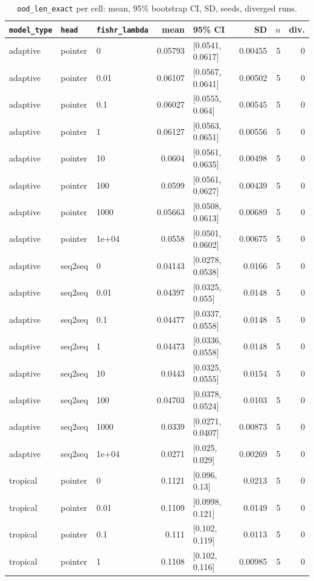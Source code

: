 \documentclass[10pt]{article}
\begin{document}
{\small
\begin{longtable}{lllrlrrr}
\caption{\texttt{ood\_len\_exact} per cell: mean, 95\% bootstrap CI, SD, seeds, diverged runs.}\label{tab:summary-ood_len_exact}\\
\toprule
\texttt{model\_type} & \texttt{head} & \texttt{fishr\_lambda} & mean & 95\% CI & SD & $n$ & div.\\
\midrule
\endhead
adaptive & pointer & 0 & 0.05793 & [0.0541, 0.0617] & 0.00455 & 5 & 0\\
adaptive & pointer & 0.01 & 0.06107 & [0.0567, 0.0641] & 0.00502 & 5 & 0\\
adaptive & pointer & 0.1 & 0.06027 & [0.0555, 0.064] & 0.00545 & 5 & 0\\
adaptive & pointer & 1 & 0.06127 & [0.0563, 0.0651] & 0.00556 & 5 & 0\\
adaptive & pointer & 10 & 0.0604 & [0.0561, 0.0635] & 0.00498 & 5 & 0\\
adaptive & pointer & 100 & 0.0599 & [0.0561, 0.0627] & 0.00439 & 5 & 0\\
adaptive & pointer & 1000 & 0.05663 & [0.0508, 0.0613] & 0.00689 & 5 & 0\\
adaptive & pointer & 1e+04 & 0.0558 & [0.0501, 0.0602] & 0.00675 & 5 & 0\\
adaptive & seq2seq & 0 & 0.04143 & [0.0278, 0.0538] & 0.0166 & 5 & 0\\
adaptive & seq2seq & 0.01 & 0.04397 & [0.0325, 0.055] & 0.0148 & 5 & 0\\
adaptive & seq2seq & 0.1 & 0.04477 & [0.0337, 0.0558] & 0.0148 & 5 & 0\\
adaptive & seq2seq & 1 & 0.04473 & [0.0336, 0.0558] & 0.0148 & 5 & 0\\
adaptive & seq2seq & 10 & 0.0443 & [0.0325, 0.0555] & 0.0154 & 5 & 0\\
adaptive & seq2seq & 100 & 0.04703 & [0.0378, 0.0524] & 0.0103 & 5 & 0\\
adaptive & seq2seq & 1000 & 0.0339 & [0.0271, 0.0407] & 0.00873 & 5 & 0\\
adaptive & seq2seq & 1e+04 & 0.0271 & [0.025, 0.029] & 0.00269 & 5 & 0\\
tropical & pointer & 0 & 0.1121 & [0.096, 0.13] & 0.0213 & 5 & 0\\
tropical & pointer & 0.01 & 0.1109 & [0.0998, 0.121] & 0.0149 & 5 & 0\\
tropical & pointer & 0.1 & 0.111 & [0.102, 0.119] & 0.0113 & 5 & 0\\
tropical & pointer & 1 & 0.1108 & [0.102, 0.116] & 0.00985 & 5 & 0\\

\end{longtable}}
\end{document}
